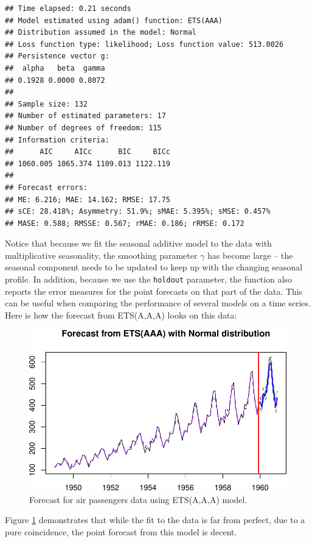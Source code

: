 \documentclass[
]{book}
\theoremstyle{definition}
\theoremstyle{definition}
\theoremstyle{definition}
\theoremstyle{definition}
\theoremstyle{remark}
\begin{document}
\begin{verbatim}
## Time elapsed: 0.21 seconds
## Model estimated using adam() function: ETS(AAA)
## Distribution assumed in the model: Normal
## Loss function type: likelihood; Loss function value: 513.0026
## Persistence vector g:
##  alpha   beta  gamma 
## 0.1928 0.0000 0.8072 
## 
## Sample size: 132
## Number of estimated parameters: 17
## Number of degrees of freedom: 115
## Information criteria:
##      AIC     AICc      BIC     BICc 
## 1060.005 1065.374 1109.013 1122.119 
## 
## Forecast errors:
## ME: 6.216; MAE: 14.162; RMSE: 17.75
## sCE: 28.418%; Asymmetry: 51.9%; sMAE: 5.395%; sMSE: 0.457%
## MASE: 0.588; RMSSE: 0.567; rMAE: 0.186; rRMSE: 0.172
\end{verbatim}

Notice that because we fit the seasonal additive model to the data with multiplicative seasonality, the smoothing parameter \(\gamma\) has become large -- the seasonal component needs to be updated to keep up with the changing seasonal profile. In addition, because we use the \texttt{holdout} parameter, the function also reports the error measures for the point forecasts on that part of the data. This can be useful when comparing the performance of several models on a time series. Here is how the forecast from ETS(A,A,A) looks on this data:

\begin{figure}
\centering
\includegraphics{Svetunkov--2022----ADAM_files/figure-latex/AirPassengersAAAForecast-1.pdf}
\caption{\label{fig:AirPassengersAAAForecast}Forecast for air passengers data using ETS(A,A,A) model.}
\end{figure}

Figure \ref{fig:AirPassengersAAAForecast} demonstrates that while the fit to the data is far from perfect, due to a pure coincidence, the point forecast from this model is decent.
\end{document}
